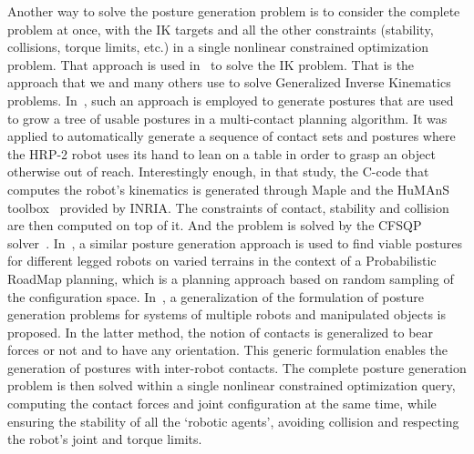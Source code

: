 Another way to solve the posture generation problem is to consider the complete problem at once, with the IK targets and all the other constraints (stability, collisions, torque limits, etc.) in a single nonlinear constrained optimization problem.
That approach is used in~\cite{Zhao1994} to solve the IK problem.
That is the approach that we and many others use to solve Generalized Inverse Kinematics problems.
In~\cite{escande:iros:2006}, such an approach is employed to generate postures that are used to grow a tree of usable postures in a multi-contact planning algorithm.
It was applied to automatically generate a sequence of contact sets and postures where the HRP-2 robot uses its hand to lean on a table in order to grasp an object otherwise out of reach.
Interestingly enough, in that study, the C-code that computes the robot's kinematics is generated through Maple and the HuMAnS toolbox~\cite{wieber2006humans} provided by INRIA.
The constraints of contact, stability and collision are then computed on top of it.
And the problem is solved by the CFSQP solver~\cite{cfsqp:manual}.
In~\cite{hauser:ijrr:2008}, a similar posture generation approach is used to find viable postures for different legged robots on varied terrains in the context of a Probabilistic RoadMap planning, which is a planning approach based on random sampling of the configuration space.
In~\cite{bouyarmane2010static}, a generalization of the formulation of posture generation problems for systems of multiple robots and manipulated objects is proposed.
In the latter method, the notion of contacts is generalized to bear forces or not and to have any orientation.
This generic formulation enables the generation of postures with inter-robot contacts.
The complete posture generation problem is then solved within a single nonlinear constrained optimization query, computing the contact forces and joint configuration at the same time, while ensuring the stability of all the `robotic agents', avoiding collision and respecting the robot's joint and torque limits.

